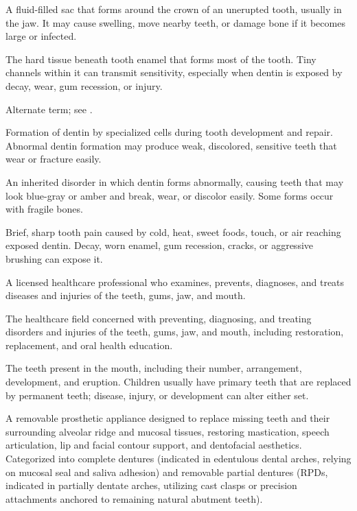  A fluid-filled sac that forms around the crown of an unerupted tooth, usually in the jaw. It may cause swelling, move nearby teeth, or damage bone if it becomes large or infected.

 The hard tissue beneath tooth enamel that forms most of the tooth. Tiny channels within it can transmit sensitivity, especially when dentin is exposed by decay, wear, gum recession, or injury.

 Alternate term; see .

 Formation of dentin by specialized cells during tooth development and repair. Abnormal dentin formation may produce weak, discolored, sensitive teeth that wear or fracture easily.

 An inherited disorder in which dentin forms abnormally, causing teeth that may look blue-gray or amber and break, wear, or discolor easily. Some forms occur with fragile bones.

 Brief, sharp tooth pain caused by cold, heat, sweet foods, touch, or air reaching exposed dentin. Decay, worn enamel, gum recession, cracks, or aggressive brushing can expose it.

 A licensed healthcare professional who examines, prevents, diagnoses, and treats diseases and injuries of the teeth, gums, jaw, and mouth.

 The healthcare field concerned with preventing, diagnosing, and treating disorders and injuries of the teeth, gums, jaw, and mouth, including restoration, replacement, and oral health education.

 The teeth present in the mouth, including their number, arrangement, development, and eruption. Children usually have primary teeth that are replaced by permanent teeth; disease, injury, or development can alter either set.

 A removable prosthetic appliance designed to replace missing teeth and their surrounding alveolar ridge and mucosal tissues, restoring mastication, speech articulation, lip and facial contour support, and dentofacial aesthetics. Categorized into complete dentures (indicated in edentulous dental arches, relying on mucosal seal and saliva adhesion) and removable partial dentures (RPDs, indicated in partially dentate arches, utilizing cast clasps or precision attachments anchored to remaining natural abutment teeth).

